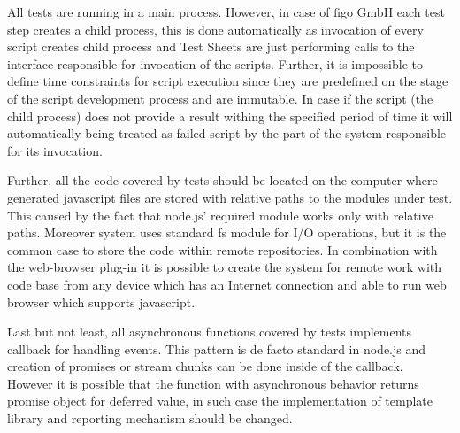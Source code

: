 All tests are running in a main process. However, in case of figo GmbH each test step creates a child process, this is done automatically as invocation of every script creates child process and Test Sheets are just performing calls to the interface responsible for invocation of the scripts. Further, it is impossible to define time constraints for script execution since they are predefined on the stage of the script development process and are immutable. In case if the script (the child process) does not provide a result withing the specified period of time it will automatically being treated as failed script by the part of the system responsible for its invocation.

Further, all the code covered by tests should be located on the computer where generated javascript files are stored with relative paths to the modules under test. This caused by the fact that node.js' required module works only with relative paths. Moreover system uses standard fs module for I/O operations, but it is the common case to store the code within remote repositories. In combination with the web-browser plug-in it is possible to create the system for remote work with code base from any device which has an Internet connection and able to run web browser which supports javascript.

Last but not least, all asynchronous functions covered by tests implements callback for handling events. This pattern is de facto standard in node.js and creation of promises or stream chunks can be done inside of the callback. However it is possible that the function with asynchronous behavior returns promise object for deferred value, in such case the implementation of template library and reporting mechanism should be changed.

%




